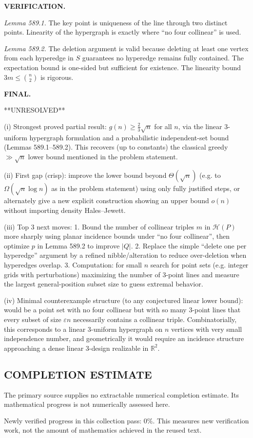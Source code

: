 \bigskip
\noindent\textbf{VERIFICATION.}

\emph{Lemma 589.1.} The key point is uniqueness of the line through two distinct points.
Linearity of the hypergraph is exactly where ``no four collinear'' is used.

\emph{Lemma 589.2.} The deletion argument is valid because deleting at least one vertex from each hyperedge in $S$ guarantees no hyperedge remains fully contained.
The expectation bound is one-sided but sufficient for existence.
The linearity bound $3m\le \binom{n}{2}$ is rigorous.

\bigskip
\noindent\textbf{FINAL.}

**UNRESOLVED**

(i) Strongest proved partial result: $g(n)\ge \frac{2}{3}\sqrt n$ for all $n$, via the linear 3-uniform hypergraph formulation and a probabilistic independent-set bound (Lemmas 589.1--589.2). This recovers (up to constants) the classical greedy $\gg \sqrt n$ lower bound mentioned in the problem statement.

(ii) First gap (crisp): improve the lower bound beyond $\Theta(\sqrt n)$ (e.g. to $\Omega(\sqrt n\log n)$ as in the problem statement) using only fully justified steps, or alternately give a new explicit construction showing an upper bound $o(n)$ without importing density Hales--Jewett.

(iii) Top 3 next moves:
1. Bound the number of collinear triples $m$ in $\mathcal{H}(P)$ more sharply using planar incidence bounds under ``no four collinear'', then optimize $p$ in Lemma 589.2 to improve $|Q|$.
2. Replace the simple ``delete one per hyperedge'' argument by a refined nibble/alteration to reduce over-deletion when hyperedges overlap.
3. Computation: for small $n$ search for point sets (e.g. integer grids with perturbations) maximizing the number of 3-point lines and measure the largest general-position subset size to guess extremal behavior.

(iv) Minimal counterexample structure (to any conjectured linear lower bound): would be a point set with no four collinear but with so many 3-point lines that every subset of size $\varepsilon n$ necessarily contains a collinear triple. Combinatorially, this corresponds to a linear 3-uniform hypergraph on $n$ vertices with very small independence number, and geometrically it would require an incidence structure approaching a dense linear 3-design realizable in $\mathbb{R}^2$.



\subsection*{COMPLETION ESTIMATE}
The primary source supplies no extractable numerical completion estimate. Its mathematical progress is not numerically assessed here.

Newly verified progress in this collection pass: $0\%$. This measures new verification work, not the amount of mathematics achieved in the reused text.
